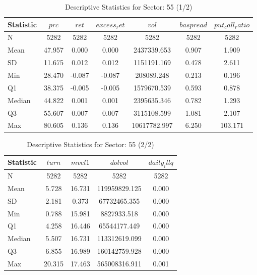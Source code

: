     \begin{table}[ht]
    \centering

    
    \caption{Descriptive Statistics for Sector: 55 (1/2)}
    \label{tab:sec55_a}
    
    \begin{tabular}{lcccccc}
    \toprule
    Statistic & $prc$ & $ret$ & $excess_ret$ & $vol$ & $baspread$ & $put_call_ratio$ \\\midrule
    N & 5282 & 5282 & 5282 & 5282 & 5282 & 5282 \\
    Mean & 47.957 & 0.000 & 0.000 & 2437339.653 & 0.907 & 1.909 \\
    SD & 11.675 & 0.012 & 0.012 & 1151191.169 & 0.478 & 2.611 \\
    Min & 28.470 & -0.087 & -0.087 & 208089.248 & 0.213 & 0.196 \\
    Q1 & 38.375 & -0.005 & -0.005 & 1579670.539 & 0.593 & 0.878 \\
    Median & 44.822 & 0.001 & 0.001 & 2395635.346 & 0.782 & 1.293 \\
    Q3 & 55.607 & 0.007 & 0.007 & 3115108.599 & 1.081 & 2.107 \\
    Max & 80.605 & 0.136 & 0.136 & 10617782.997 & 6.250 & 103.171 \\
    \bottomrule
    \end{tabular}

    \end{table}
    
    \begin{table}[ht]
    \centering

    
    \caption{Descriptive Statistics for Sector: 55 (2/2)}
    \label{tab:sec55_b}
    
    \begin{tabular}{lcccc}
    \toprule
    Statistic & $turn$ & $mvel1$ & $dolvol$ & $daily_illq$ \\\midrule
    N & 5282 & 5282 & 5282 & 5282 \\
    Mean & 5.728 & 16.731 & 119959829.125 & 0.000 \\
    SD & 2.181 & 0.373 & 67732465.355 & 0.000 \\
    Min & 0.788 & 15.981 & 8827933.518 & 0.000 \\
    Q1 & 4.258 & 16.446 & 65544177.449 & 0.000 \\
    Median & 5.507 & 16.731 & 113312619.099 & 0.000 \\
    Q3 & 6.855 & 16.989 & 160142759.928 & 0.000 \\
    Max & 20.315 & 17.463 & 565008316.911 & 0.001 \\
    \bottomrule
    \end{tabular}

    \end{table}
    
